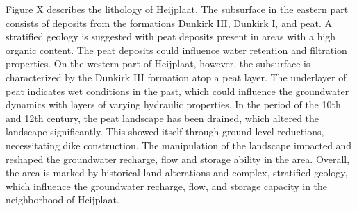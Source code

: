 Figure X describes the lithology of Heijplaat. The subsurface in the eastern part consists of deposits from the formations Dunkirk III, Dunkirk I, and peat. A stratified geology is suggested with peat deposits present in areas with a high organic content. The peat deposits could influence water retention and filtration properties. On the western part of Heijplaat, however, the subsurface is characterized by the Dunkirk III formation atop a peat layer. The underlayer of peat indicates wet conditions in the past, which could influence the groundwater dynamics with layers of varying hydraulic properties. In the period of the 10th and 12th century, the peat landscape has been drained, which altered the landscape significantly. This showed itself through ground level reductions, necessitating dike construction. The manipulation of the landscape impacted and reshaped the groundwater recharge, flow and storage ability in the area. Overall, the area is marked by historical land alterations and complex, stratified geology, which influence the groundwater recharge, flow, and storage capacity in the neighborhood of Heijplaat. 

